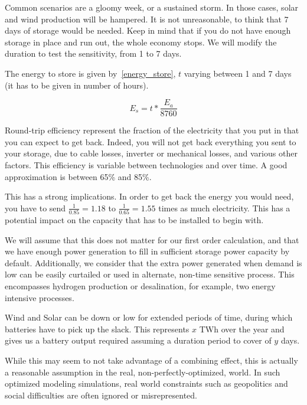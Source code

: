Common scenarios are a gloomy week, or a sustained storm. In those cases, solar and wind production will be hampered. It is not unreasonable, to think that 7 days of storage would be needed. Keep in mind that if you do not have enough storage in place and run out, the whole economy stops. We will modify the duration to test the sensitivity, from 1 to 7 days.


\begin{remark}
The energy to store is given by~\ref{energy_store}, $t$ varying between 1 and 7 days (it has to be given in number of hours).

\begin{equation}\label{energy_store}
E_s = t * \frac{E_a}{8760}
\end{equation}

\end{remark}

Round-trip efficiency represent the fraction of the electricity that you put in that you can expect to get back. Indeed, you will not get back everything you sent to your storage, due to cable losses, inverter or mechanical losses, and various other factors. This efficiency is variable between technologies and over time. A good approximation is between 65\% and 85\%. 

This has a strong implications. In order to get back the energy you would need, you have to send $\frac{1}{0.85} = 1.18$ to $\frac{1}{0.65} = 1.55$ times as much electricity. This has a potential impact on the capacity that has to be installed to begin with.

We will assume that this does not matter for our first order calculation, and that we have enough power generation to fill in sufficient storage power capacity by default. Additionally, we consider that the extra power generated when demand is low can be easily curtailed or used in alternate, non-time sensitive process. This encompasses hydrogen production or desalination, for example, two energy intensive processes.



\begin{kaobox}[frametitle=What we have said]
Wind and Solar can be down or low for extended periods of time, during which batteries have to pick up the slack. This represents $x$ TWh over the year and gives us a battery output required assuming a duration period to cover of $y$ days.

While this may seem to not take advantage of a combining effect, this is actually a reasonable assumption in the real, non-perfectly-optimized, world. In such optimized modeling simulations, real world constraints such as geopolitics and social difficulties are often ignored or misrepresented.

\end{kaobox}


